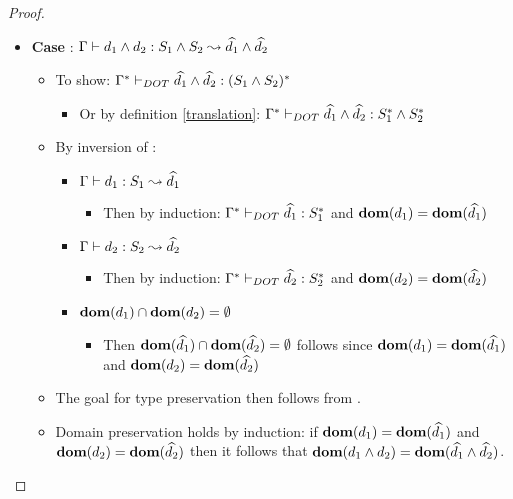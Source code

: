 \begin{proof}
\begin{itemize}
        \item \textbf{Case} : $\Gamma \vdash d_1 \wedge d_2: S_1 \wedge S_2 \leadsto \widehat{d_1} \wedge \widehat{d_2}$
        \begin{itemize}
            \item To show: $\Gamma^{*} \vdash_{DOT} \widehat{d_1} \wedge \widehat{d_2}: (S_1 \wedge S_2)^{*}$
            \begin{itemize}
                \item Or by definition \ref{translation}:
                    $\Gamma^{*} \vdash_{DOT} \widehat{d_1} \wedge \widehat{d_2}: S_1^{*} \wedge S_2^{*}$
            \end{itemize}
            \item By inversion of :
            \begin{itemize}
                \item $\Gamma \vdash d_1: S_1 \leadsto \widehat{d_1}$
                \begin{itemize}
                    \item Then by induction:
                        $\Gamma^{*} \vdash_{DOT} \widehat{d_1}: S_1^{*}$ and
                        $\textbf{dom}(d_1) = \textbf{dom}(\widehat{d_1})$
                \end{itemize}
                \item $\Gamma \vdash d_2: S_2 \leadsto \widehat{d_2}$
                \begin{itemize}
                    \item Then by induction:
                        $\Gamma^{*} \vdash_{DOT} \widehat{d_2}: S_2^{*}$ and
                        $\textbf{dom}(d_2) = \textbf{dom}(\widehat{d_2})$
                \end{itemize}
                \item $\textbf{dom}(d_1) \cap \textbf{dom}(d_2) = \emptyset$
                \begin{itemize}
                    \item Then $\textbf{dom}(\widehat{d_1}) \cap \textbf{dom}(\widehat{d_2}) =
                        \emptyset$ follows since $\textbf{dom}(d_1) = \textbf{dom}(\widehat{d_1})$
                        and $\textbf{dom}(d_2) = \textbf{dom}(\widehat{d_2})$
                \end{itemize}
            \end{itemize}
            \item The goal for type preservation then follows from
                .
            \item Domain preservation holds by induction: if $\textbf{dom}(d_1) =
                \textbf{dom}(\widehat{d_1})$ and $\textbf{dom}(d_2) = \textbf{dom}(\widehat{d_2})$ then it
                follows that $\textbf{dom}(d_1 \wedge d_2) =
                \textbf{dom}(\widehat{d_1} \wedge \widehat{d_2})$.
        \end{itemize}
    \end{itemize}
\end{proof}

